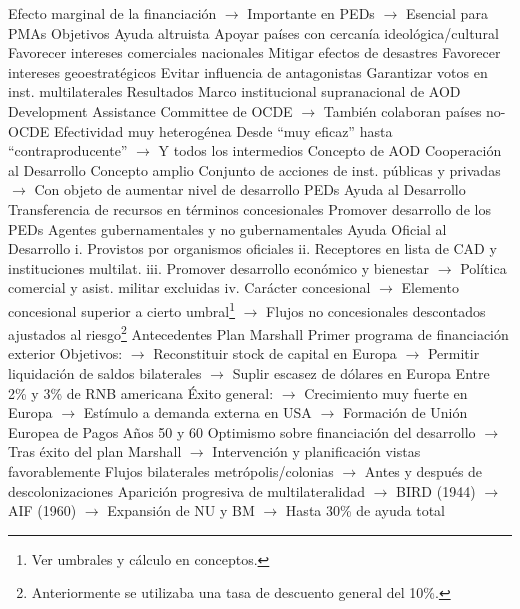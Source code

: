 \documentclass{nuevotema}
\begin{document}
\begin{esquemal}
				\4[] Efecto marginal de la financiación
				\4[] $\to$ Importante en PEDs
				\4[] $\to$ Esencial para PMAs
				\4 Objetivos
				\4[] Ayuda altruista
				\4[] Apoyar países con cercanía ideológica/cultural
				\4[] Favorecer intereses comerciales nacionales
				\4[] Mitigar efectos de desastres
				\4[] Favorecer intereses geoestratégicos
				\4[] Evitar influencia de antagonistas
				\4[] Garantizar votos en inst. multilaterales
				\4 Resultados
				\4[] Marco institucional supranacional de AOD
				\4[] Development Assistance Committee de OCDE
				\4[] $\to$ También colaboran países no-OCDE
				\4[] Efectividad muy heterogénea
				\4[] Desde ``muy eficaz'' hasta ``contraproducente''
				\4[] $\to$ Y todos los intermedios
			\3 Concepto de AOD
				\4 Cooperación al Desarrollo
				\4[] Concepto amplio
				\4[] Conjunto de acciones de inst. públicas y privadas
				\4[] $\to$ Con objeto de aumentar nivel de desarrollo PEDs
				\4 Ayuda al Desarrollo
				\4[] Transferencia de recursos en términos concesionales
				\4[] Promover desarrollo de los PEDs
				\4[] Agentes gubernamentales y no gubernamentales
				\4 Ayuda Oficial al Desarrollo
				\4[] i. Provistos por organismos oficiales
				\4[] ii. Receptores en lista de CAD y instituciones multilat.
				\4[] iii. Promover desarrollo económico y bienestar
				\4[] $\to$ Política comercial y asist. militar excluidas
				\4[] iv. Carácter concesional
				\4[] $\to$ Elemento concesional superior a cierto umbral\footnote{Ver umbrales y cálculo en conceptos.}
				\4[] $\to$ Flujos no concesionales descontados ajustados al riesgo\footnote{Anteriormente se utilizaba una tasa de descuento general del 10\%.}
			\3 Antecedentes
				\4 Plan Marshall
				\4[] Primer programa de financiación exterior
				\4[] Objetivos:
				\4[] $\to$ Reconstituir stock de capital en Europa
				\4[] $\to$ Permitir liquidación de saldos bilaterales
				\4[] $\to$ Suplir escasez de dólares en Europa
				\4[] Entre 2\% y 3\% de RNB americana
				\4[] Éxito general:
				\4[] $\to$ Crecimiento muy fuerte en Europa
				\4[] $\to$ Estímulo a demanda externa en USA
				\4[] $\to$ Formación de Unión Europea de Pagos
				\4 Años 50 y 60
				\4[] Optimismo sobre financiación del desarrollo
				\4[] $\to$ Tras éxito del plan Marshall
				\4[] $\to$ Intervención y planificación vistas favorablemente
				\4[] Flujos bilaterales metrópolis/colonias
				\4[] $\to$ Antes y después de descolonizaciones
				\4[] Aparición progresiva de multilateralidad
				\4[] $\to$ BIRD (1944)
				\4[] $\to$ AIF (1960)
				\4[] $\to$ Expansión de NU y BM
				\4[] $\to$ Hasta 30\% de ayuda total

\end{esquemal}
\end{document}
